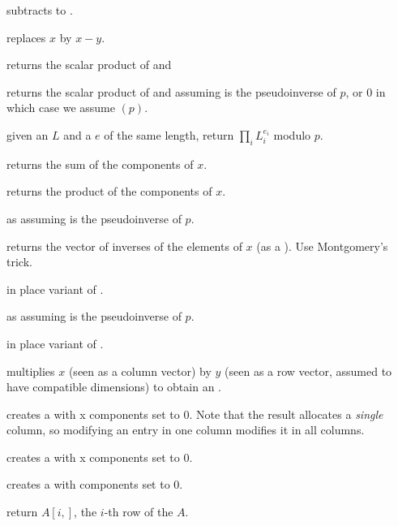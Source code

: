  subtracts  to .

 replaces $x$ by $x-y$.

 returns the scalar product
of  and 

 returns the
scalar product of  and  assuming  is the pseudoinverse of
$p$, or $0$ in which case we assume $(p)$.

 given an  $L$
and a  $e$ of the same length, return $\prod_i L_i^{e_i}$ modulo $p$.

 returns the sum of the components of $x$.

 returns the product of the components of
$x$.

 as 
assuming  is the pseudoinverse of $p$.

 returns the vector of inverses of the
elements of $x$ (as a ). Use Montgomery's trick.

 in place variant of .

 as 
assuming  is the pseudoinverse of $p$.

 in place variant of
.

 multiplies $x$
(seen as a column vector) by $y$ (seen as a row vector,
assumed to have compatible dimensions) to obtain an .

 creates a  with  x 
components set to $0$. Note that the result allocates a
\emph{single} column, so modifying an entry in one column modifies it in
all columns.

 creates a  with  x
 components set to $0$.

 creates a  with  components set to
$0$.

 return $A[i,]$, the $i$-th row of the
 $A$.

